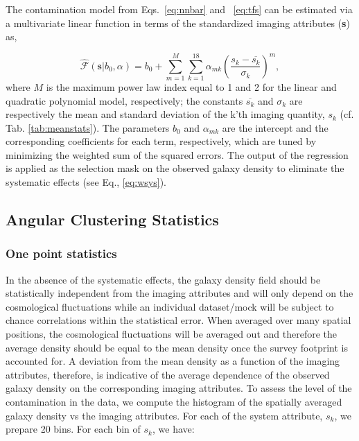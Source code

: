The contamination model from Eqs.~\ref{eq:nnbar} and ~\ref{eq:tfs} can be estimated via a multivariate linear function in terms of the standardized imaging attributes (\textbf{s}) as,

\begin{equation}\label{eq:multvar}
\hat{\mathcal{F}}(\textbf{s}|b_{0},\alpha) = b_{0} + \sum_{m=1}^{M}\sum_{k=1}^{18} \alpha_{mk} (\frac{s_{k}-\overline{s_{k}}}{\sigma_{k}})^{m} ,
\end{equation}
where $M$ is the maximum power law index equal to 1 and 2 for the linear and quadratic polynomial model, respectively; the constants $\overline{s_{k}}$ and $\sigma_{k}$ are respectively the mean and standard deviation of the k'th imaging quantity, $s_{k}$ (cf. Tab. \ref{tab:meanstats}). The parameters $b_{0}$ and $\alpha_{mk}$ are the intercept and the corresponding coefficients for each term, respectively, which are tuned by minimizing the weighted sum of the squared errors. The output of the regression is applied as the selection mask on the observed galaxy density to eliminate the systematic effects (see Eq., \ref{eq:wsys}).\\

\subsection{Angular Clustering Statistics}\label{subsec:ang_clustering}
\subsubsection{One point statistics}
In the absence of the systematic effects, the galaxy density field should be statistically independent from the imaging attributes and will only depend on the cosmological fluctuations while an individual dataset/mock will be subject to chance correlations within the statistical error. When averaged over many spatial positions, the cosmological fluctuations will be averaged out and therefore the average density should be equal to the mean density once the survey footprint is accounted for. A deviation from the mean density as a function of the imaging attributes, therefore, is indicative of the average dependence of the observed galaxy density on the corresponding imaging attributes. To assess the level of the contamination in the data, we compute the histogram of the spatially averaged galaxy density vs the imaging attributes. For each of the system attribute, $s_k$, we prepare 20 bins. For each bin of $s_{k}$, we have:

